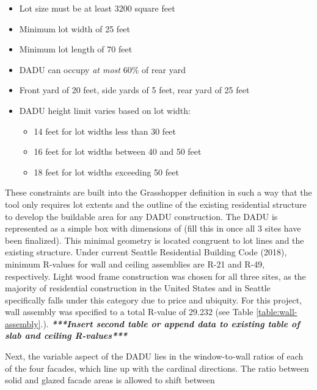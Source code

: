 \documentclass[sagev,times,Royal]{sagej}
\begin{document}
\begin{itemize}
	\item Lot size must be at least 3200 square feet
	\item Minimum lot width of 25 feet
	\item Minimum lot length of 70 feet
	\item DADU can occupy \textit{at most} 60\% of rear yard	
	\item Front yard of 20 feet, side yards of 5 feet, rear yard of 25  feet
	\item DADU height limit varies based on lot width: \begin{itemize}
	\item 14 feet for lot widths less than 30 feet
	\item 16 feet for lot widths between 40 and 50 feet
	\item 18 feet for lot widths exceeding 50 feet \end{itemize}
\end{itemize}

These constraints are built into the Grasshopper definition in such a way that the tool only requires lot extents and the outline of the existing residential structure to develop the buildable area for any DADU construction. The DADU is represented as a simple box with dimensions of (fill this in once all 3 sites have been finalized). This minimal geometry is located congruent to lot lines and the existing structure. Under current Seattle Residential Building Code (2018), minimum R-values for wall and ceiling assemblies are R-21 and R-49, respectively. Light wood frame construction was chosen for all three sites, as the majority of residential construction in the United States and in Seattle specifically falls under this category due to price and ubiquity. For this project, wall assembly was specified to a total R-value of 29.232 (see Table \ref{table:wall-assembly}.). 
\textit{\textbf{***Insert second table or append data to existing table of slab and ceiling R-values***}}

Next, the variable aspect of the DADU lies in the window-to-wall ratios of each of the four facades, which line up with the cardinal directions. The ratio between solid and glazed facade areas is allowed to shift between 
\end{document}
